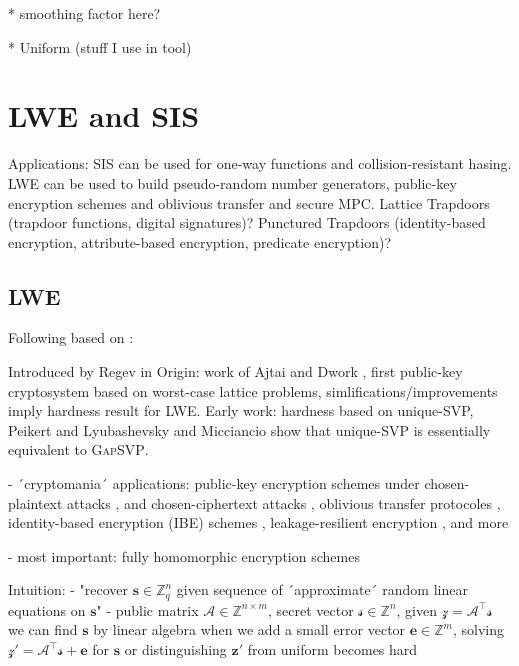 \documentclass[
  a4paper,  %
  twoside,  %
  bibliography=totoc,
  headsepline,
  cleardoublepage=empty,
  parskip=half,
  draft=false
]{scrbook}
\begin{document}
    * smoothing factor here?

    * Uniform (stuff I use in tool)







\section{LWE and SIS}
Applications: SIS can be used for one-way functions and collision-resistant hasing. LWE can be used to build pseudo-random number generators, public-key encryption schemes and oblivious transfer and secure MPC. Lattice Trapdoors (trapdoor functions, digital signatures)? Punctured Trapdoors (identity-based encryption, attribute-based encryption, predicate encryption)? %

\subsection{LWE}
Following based on \cite{Reg10}:%

Introduced by Regev in \cite{Reg09}
Origin: work of Ajtai and Dwork \cite{AD97}, first public-key cryptosystem based on worst-case lattice problems, simlifications/improvements \cite{GGH97b, Reg03} imply hardness result for LWE. 
Early work: hardness based on unique-SVP, Peikert \cite{Pei09} and Lyubashevsky and Micciancio \cite{LM09} show that unique-SVP is essentially equivalent to \textsc{GapSVP}.

- ´cryptomania´ applications: public-key encryption schemes under chosen-plaintext attacks \cite{Reg05, KTX07, PVW08}, and chosen-ciphertext attacks \cite{PW08, Pei09}, oblivious transfer protocoles \cite{PVW08}, identity-based encryption (IBE) schemes \cite{GPV08, CHKP10, ABB10}, leakage-resilient encryption \cite{AGV09, ACPS09, DGKPV10, GKPV10}, and more %

- most important: fully homomorphic encryption schemes \cite{Gen09a, BV11, Bra12, GSW13} %

Intuition: 
- "recover $\mathbf{s} \in \mathbb{Z}_q^n$ given sequence of ´approximate´ random linear equations on $\mathbf{s}$" 
- public matrix  $\mathcal{A} \in \mathbb{Z}^{n \times m}$, secret vector $\mathcal{s}\in \mathbb{Z}^n$, given $\mathcal{z} = \mathcal{A}^\intercal \mathcal{s}$ we can find $\mathbf{s}$ by linear algebra
when we add a small error vector $\mathbf{e} \in \mathbb{Z}^m$, solving $\mathcal{z}' = \mathcal{A}^\intercal \mathcal{s} + \mathbf{e}$ for $\mathbf{s}$ or distinguishing $\mathbf{z}'$ from uniform becomes hard
\end{document}
